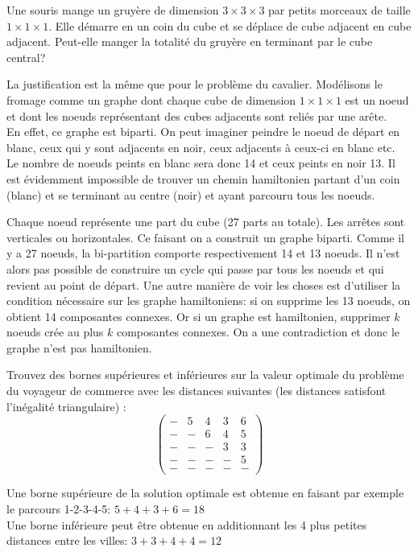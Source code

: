 Une souris mange un gruyère de dimension $3 \times 3 \times 3$ par petits morceaux de taille $1 \times 1 \times 1$. Elle démarre en un coin du cube et se déplace de cube adjacent en cube adjacent. Peut-elle manger la totalité du gruyère en terminant par le cube central?
\begin{solution}
La justification est la même que pour le problème du cavalier. Modélisons le fromage comme un graphe dont chaque cube de dimension $1 \times 1 \times 1$ est un noeud et dont les noeuds représentant des cubes adjacents sont reliés par une arête.\\
En effet, ce graphe est biparti. On peut imaginer peindre le noeud de départ en blanc, ceux qui y sont adjacents en noir, ceux adjacents à ceux-ci en blanc etc.\\
Le nombre de noeuds peints en blanc sera donc 14 et ceux peints en noir 13. Il est évidemment impossible de trouver un chemin hamiltonien partant d'un coin (blanc) et se terminant au centre (noir) et ayant parcouru tous les noeuds.
\end{solution}

\begin{solution}
Chaque noeud représente une part du cube (27 parts au totale). Les arrêtes sont verticales ou horizontales. Ce faisant on a construit un graphe biparti. Comme il y a 27 noeuds, la bi-partition comporte respectivement 14 et 13 noeuds. Il n'est alors pas possible de construire un cycle qui passe par tous les noeuds et qui revient au point de départ. Une autre manière de voir les choses est d'utiliser la condition nécessaire sur les graphe hamiltoniens: si on supprime les 13 noeuds, on obtient 14 composantes connexes. Or si un graphe est hamiltonien, supprimer $k$ noeuds crée au plus $k$ composantes connexes. On a une contradiction et donc le graphe n'est pas hamiltonien.
\end{solution}

Trouvez des bornes supérieures et inférieures sur la valeur optimale du problème du voyageur de commerce avec les distances suivantes (les distances satisfont l'inégalité triangulaire) :
\begin{equation}
  \left( \begin{matrix}
      - & 5 & 4 & 3 & 6 \\
      - & - & 6 & 4 & 5 \\
      - & - & - & 3 & 3 \\
      - & - & - & - & 5 \\
      - & - & - & - & -
  \end{matrix}  \right)
\end{equation}
\begin{solution}
Une borne supérieure de la solution optimale est obtenue en faisant par exemple le parcours 1-2-3-4-5: $5+4+3+6=18$\\
Une borne inférieure peut être obtenue en additionnant les 4 plus petites distances entre les villes: $3+3+4+4=12$\\
\end{solution}

